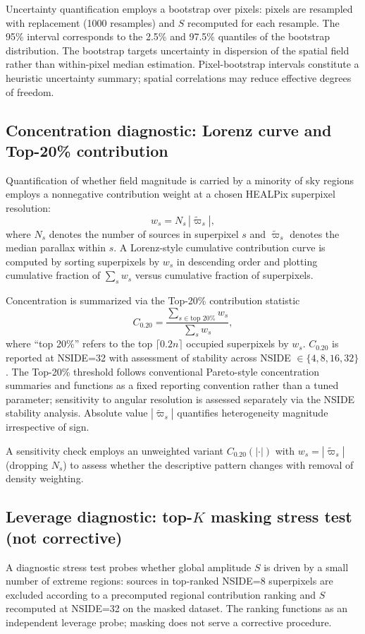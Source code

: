 \documentclass{aa}
\begin{document}
Uncertainty quantification employs a bootstrap over pixels: pixels are resampled with replacement (1000 resamples) and $S$ recomputed for each resample. The 95\% interval corresponds to the 2.5\% and 97.5\% quantiles of the bootstrap distribution. The bootstrap targets uncertainty in dispersion of the spatial field rather than within-pixel median estimation. Pixel-bootstrap intervals constitute a heuristic uncertainty summary; spatial correlations may reduce effective degrees of freedom.

\subsection{\texorpdfstring{Concentration diagnostic: Lorenz curve and Top-20\% contribution}{Concentration diagnostic: Lorenz curve and Top-20 percent contribution}}
Quantification of whether field magnitude is carried by a minority of sky regions employs a nonnegative contribution weight at a chosen HEALPix superpixel resolution:
\[
w_s = N_s \, |\tilde{\varpi}_s|,
\]
where $N_s$ denotes the number of sources in superpixel $s$ and $\tilde{\varpi}_s$ denotes the median parallax within $s$. A Lorenz-style cumulative contribution curve is computed by sorting superpixels by $w_s$ in descending order and plotting cumulative fraction of $\sum_s w_s$ versus cumulative fraction of superpixels.

Concentration is summarized via the Top-20\% contribution statistic
\[
C_{0.20} = \frac{\sum_{s \in \text{top 20\%}} w_s}{\sum_s w_s},
\]
where ``top 20\%'' refers to the top $\lceil 0.2 n \rceil$ occupied superpixels by $w_s$. $C_{0.20}$ is reported at NSIDE=32 with assessment of stability across NSIDE $\in \{4,8,16,32\}$. The Top-20\% threshold follows conventional Pareto-style concentration summaries and functions as a fixed reporting convention rather than a tuned parameter; sensitivity to angular resolution is assessed separately via the NSIDE stability analysis. Absolute value $|\tilde{\varpi}_s|$ quantifies heterogeneity magnitude irrespective of sign.

A sensitivity check employs an unweighted variant $C_{0.20}(|\cdot|)$ with $w_s = |\tilde{\varpi}_s|$ (dropping $N_s$) to assess whether the descriptive pattern changes with removal of density weighting.

\subsection{\texorpdfstring{Leverage diagnostic: top-\texorpdfstring{$K$}{K} masking stress test}{Leverage diagnostic: top-K masking stress test} (not corrective)}
A diagnostic stress test probes whether global amplitude $S$ is driven by a small number of extreme regions: sources in top-ranked NSIDE=8 superpixels are excluded according to a precomputed regional contribution ranking and $S$ recomputed at NSIDE=32 on the masked dataset. The ranking functions as an independent leverage probe; masking does not serve a corrective procedure.
\end{document}
